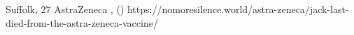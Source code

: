           {Suffolk, }
          {27}
          {AstraZeneca}
          {}
          {
            ,
             ()
          }
          {https://nomoresilence.world/astra-zeneca/jack-last-died-from-the-astra-zeneca-vaccine/}

